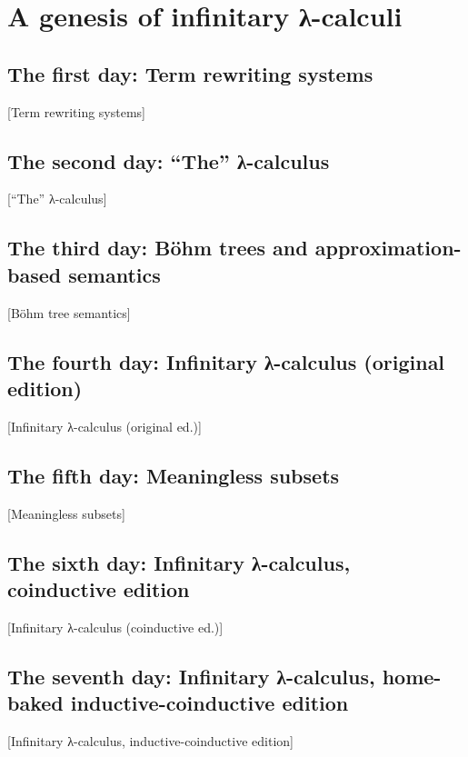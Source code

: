 \chapter{A genesis of infinitary λ-calculi}
\label{chap:lambda}
\margintoc


\section{The first day: Term rewriting systems}%
[Term rewriting systems]

\lipsum[1]


\section{The second day: \enquote{The} λ-calculus}%
[\enquote{The} λ-calculus]

\lipsum[2]


\section{The third day: Böhm trees and approximation-based semantics}%
[Böhm tree semantics]

\lipsum[3]


\section{The fourth day: Infinitary λ-calculus (original edition)}%
[Infinitary λ-calculus (original ed.)]

\lipsum[4]


\section{The fifth day: Meaningless subsets}%
[Meaningless subsets]

\lipsum[5]


\section{The sixth day: Infinitary λ-calculus, coinductive edition}%
[Infinitary λ-calculus (coinductive ed.)]

\lipsum[6]


\section{The seventh day: Infinitary λ-calculus, home-baked 
inductive-coinductive edition}%
[Infinitary λ-calculus, inductive-coinductive edition]

\lipsum[7]


